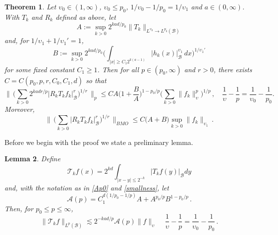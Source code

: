 \documentclass[11pt]{amsart}
\newtheorem{theorem}{Theorem}[section]
\newtheorem{lemma}[theorem]{Lemma}
\theoremstyle{definition}
\numberwithin{theorem}{section}
\numberwithin{definition}{section}
\renewcommand{\wp}{\upsilon}
\newcommand{\Be}{\begin{equation}}
\newcommand{\Ee}{\end{equation}}
\newcommand{\note}[1]{\footnote{\texttt{\Small #1}}}
\def\sB{{\mathscr{B}}}
\def\lc{\lesssim}
\def\eps{\varepsilon}
\def\cA{{\mathcal {A}}}
\def\cT{{\mathcal {T}}}
\begin{document}
\begin{theorem}  \label{dyadicpieces}
Let $\wp_0\in(1,\infty)$, $\wp_0\le p_0$, $1/\wp_0-1/p_0=1/\wp_1$
 and $a\in(0,\infty)$. With $T_k$ and $R_k$  defined as above, let
\Be\label{Ap0} A:=\sup_{k>0} 2^{kad/p_0}\|T_k\|_{L^{\wp_0}\to L^{p_0}(\sB)}
\Ee
and, for $1/\wp_1+1/\wp_1'=1$,
\Be \label{smallness}
B:=
\sup_{k>0} 2^{kad/p_0}    \Big(\int_{|x|\ge C_1 2^{k(a-1) }}|h_k(x)|_{\sB}^{\wp_1} \,dx\Big)^{1/\wp_1'}
\Ee
for some fixed constant $C_1\ge 1$.
Then for all $p\in (p_0,\infty)$ and  $r>0$,   there exists $C=C(p_0,p,r,C_0,C_1,d)$
 so that
\begin{equation}\label{trlizest}
\Big\|\,\Big( \sum_{k>0} 2^{kad r/p}
|R_k{T}_{k} f_{k}|_{\sB}^r\Big)^{1/r}
 \,\Big\|_{p} \le C
A \Big(1+\frac{B}{A}\Big)^{1-p_0/p}
\Big(\sum_{k>0} \|
f_{k}\|_{\wp}^p\Big)^{1/p}\,, \quad
\frac 1{\wp}-\frac 1{p} =\frac 1{\wp_0}-\frac 1{p_0}.
\end{equation}
Moreover,
\begin{equation}\label{bmoest}
\Big\|\,\Big( \sum_{k>0}
|R_k{T}_{k} f_{k}|_{\sB}^r\Big)^{1/r}
 \,\Big\|_{BMO} \le C
\big(A+B\big)
\sup_{k>0} \|
f_{k}\|_{\wp_1}\, .
\end{equation}
\end{theorem}

Before we begin with the proof we state a preliminary lemma.

\begin{lemma}\label{pversp0}
Define
$$\cT_k f(x)= 2^{kd}\int_{|x-y|\le 2^{-k}}|T_k f(y)|_\sB dy$$
and,  with the notation as in \eqref{Ap0} and \eqref{smallness}, let
 \Be \label{asp}
\cA(p)=
C_1^{d(1/p_0-1/p)} A + A^{{p_0}/{p}}
B^{1-{p_0}/{p}} \,.
\Ee
Then, for $p_0\le p\le \infty$,
$$
\|\cT_k f\|_{L^p(\sB)} \lc 2^{-kad/p}
\cA(p)
\|f\|_\wp\, \quad
\frac 1{\wp}-\frac 1{p} =\frac 1{\wp_0}-\frac 1{p_0}\,.
$$
\end{lemma}
\end{document}
